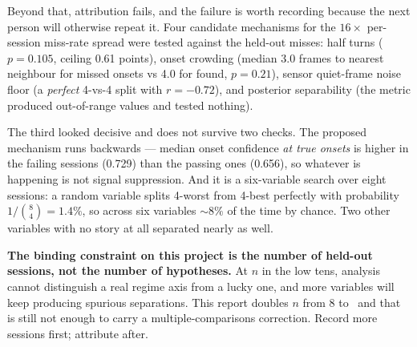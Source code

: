 Beyond that, attribution fails, and the failure is worth recording because
the next person will otherwise repeat it. Four candidate mechanisms for the
$16\times$ per-session miss-rate spread were tested against the held-out
misses: half turns ($p = 0.105$, ceiling 0.61 points), onset crowding
(median 3.0 frames to nearest neighbour for missed onsets vs 4.0 for found,
$p = 0.21$), sensor quiet-frame noise floor (a \emph{perfect} 4-vs-4 split
with $r = -0.72$), and posterior separability (the metric produced
out-of-range values and tested nothing).

The third looked decisive and does not survive two checks. The proposed
mechanism runs backwards --- median onset confidence \emph{at true onsets} is
higher in the failing sessions (0.729) than the passing ones (0.656), so
whatever is happening is not signal suppression. And it is a six-variable
search over eight sessions: a random variable splits 4-worst from 4-best
perfectly with probability $1/\binom{8}{4} = 1.4\%$, so across six variables
${\sim}8\%$ of the time by chance. Two other variables with no story at all
separated nearly as well.

\begin{keybox}
\textbf{The binding constraint on this project is the number of held-out
sessions, not the number of hypotheses.} At $n$ in the low tens, analysis
cannot distinguish a real regime axis from a lucky one, and more variables
will keep producing spurious separations. This report doubles $n$ from 8 to
\NHoldoutSolves\ and that is still not enough to carry a multiple-comparisons
correction. Record more sessions first; attribute after.
\end{keybox}
